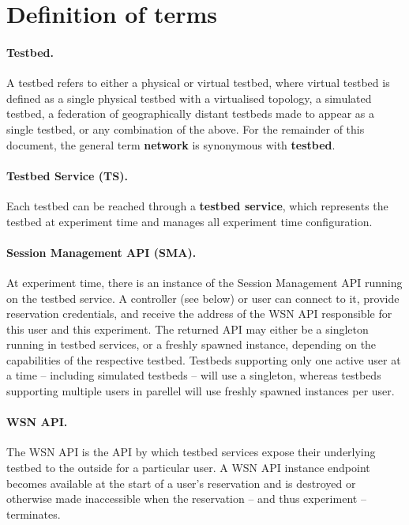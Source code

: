 \section{Definition of terms}


\paragraph{Testbed.}
A testbed refers to either a physical or virtual testbed, where virtual testbed is defined as a single physical testbed with a virtualised topology, a simulated testbed, a federation of geographically distant testbeds made to appear as a single testbed, or any combination of the above. For the remainder of this document, the general term {\bf network} is synonymous with {\bf testbed}.

\paragraph{Testbed Service (TS).}
Each testbed can be reached through a \textbf{testbed service}, which represents the testbed at experiment time and manages all experiment time configuration.

\paragraph{Session Management API (SMA).}
At experiment time, there is an instance of the Session Management API running on the testbed service. A controller (see below) or user can connect to it, provide reservation credentials, and receive the address of the WSN API responsible for this user and this experiment. The returned API may either be a singleton running in testbed services, or a freshly spawned instance, depending on the capabilities of the respective testbed. Testbeds supporting only one active user at a time -- including simulated testbeds -- will use a singleton, whereas testbeds supporting multiple users in parellel will use freshly spawned instances per user.

\paragraph{WSN API.}
The WSN API is the API by which testbed services expose their underlying testbed to the outside for a particular user. A WSN API instance endpoint becomes available at the start of a user's reservation and is destroyed or otherwise made inaccessible when the reservation -- and thus experiment -- terminates.

